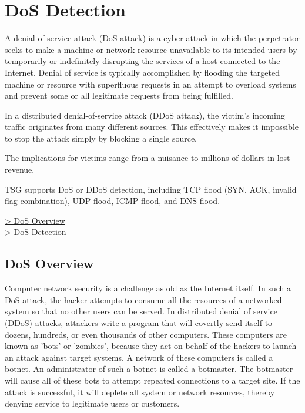 \chapter*{\hypertarget{link:DoS Detection Big}{DoS Detection}}
\label{sec:detection}

A denial-of-service attack (DoS attack) is a cyber-attack in which the perpetrator seeks to make a machine or network resource unavailable to its intended users 
by temporarily or indefinitely disrupting the services of a host connected to the Internet. 
Denial of service is typically accomplished by flooding the targeted machine or resource with superfluous requests in an attempt to overload systems 
and prevent some or all legitimate requests from being fulfilled. 


In a distributed denial-of-service attack (DDoS attack), the victim's incoming traffic originates from many different sources. 
This effectively makes it impossible to stop the attack simply by blocking a single source.


The implications for victims range from a nuisance to millions of dollars in lost revenue.


TSG supports DoS or DDoS detection, including TCP flood (SYN, ACK, invalid flag combination), UDP flood, ICMP flood, and DNS flood.   


{
\color{linkblue}
\hyperlink{link:DoS Overview}{> DoS Overview} \\
\hyperlink{link:DoS Detection}{> DoS Detection} \\
} 
\clearpage

\section*{\hypertarget{link:DoS Overview}{DoS Overview}}
\label{sec:DoS:overview}

Computer network security is a challenge as old as the Internet itself. In such a DoS attack, the hacker attempts to consume all the resources of a networked system 
so that no other users can be served. In distributed denial of service (DDoS) attacks, attackers write a program that will covertly send itself to dozens, hundreds, 
or even thousands of other computers. These computers are known as 'bots' or 'zombies', because they act on behalf of the hackers to launch an attack against target systems. 
A network of these computers is called a botnet. An administrator of such a botnet is called a botmaster. 
The botmaster will cause all of these bots to attempt repeated connections to a target site. 
If the attack is successful, it will deplete all system or network resources, thereby denying service to legitimate users or customers.


